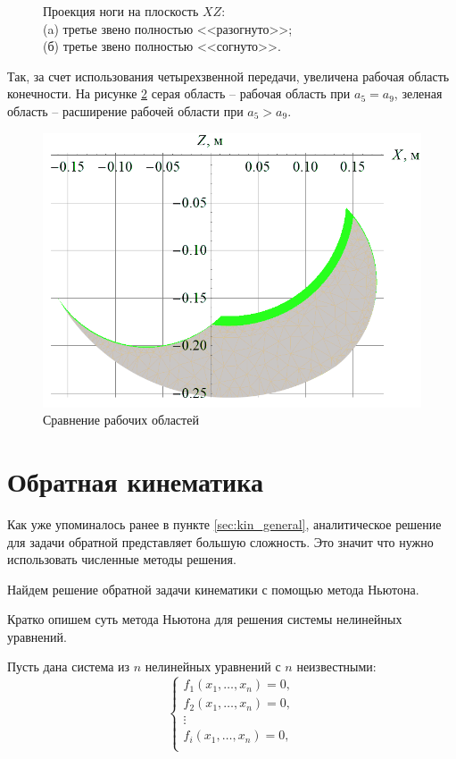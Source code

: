 \begin{figure}[ht]
    \caption{Проекция ноги на плоскость $ XZ $: \\ (a) третье звено полностью <<разогнуто>>; \\ (б) третье звено полностью <<согнуто>>.}
    \label{fig:leg_model}
\end{figure} %

Так, за счет использования четырехзвенной передачи, увеличена рабочая область конечности. На рисунке \ref{fig:fig7} серая область -- рабочая область при $ a_5 = a_9 $, зеленая область -- расширение рабочей области при $ a_5 > a_9 $.
\begin{figure}[h]
    \centering
    \includegraphics[scale=0.8]{chapter_kinematics/figure8.png}
    \caption{Сравнение рабочих областей}
    \label{fig:fig7}
\end{figure}

\section{Обратная кинематика} \label{sec:inverse_kin}
Как уже упоминалось ранее в пункте \ref{sec:kin_general}, аналитическое решение для задачи обратной представляет большую сложность. Это значит что нужно использовать численные методы решения.

Найдем решение обратной задачи кинематики с помощью метода Ньютона.

Кратко опишем суть метода Ньютона для решения системы нелинейных уравнений. 

Пусть дана система из $ n $ нелинейных уравнений с $ n $ неизвестными:
\[
\left\{ 
\begin{array}{c}
    f_1(x_1, \dots, x_n) = 0, \\
    f_2(x_1, \dots, x_n) = 0, \\
    \vdots \\
    f_i(x_1, \dots, x_n) = 0, \\
\end{array} 
\right.
\]

